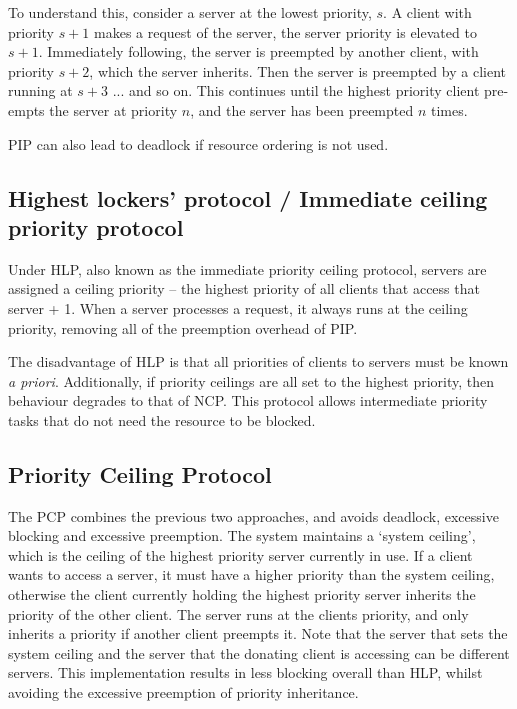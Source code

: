 To understand this, consider a  server at the lowest priority, $s$.
A client with priority $s + 1$ makes a request of the server, the server priority is elevated to $s + 1$.
Immediately following, the server is preempted by another client, with priority $s + 2$, which the server inherits.
Then the server is preempted by a client running at $s + 3$ ... and so on.
This continues until the highest priority client pre-empts the server at priority $n$, and the server has been preempted $n$ times.

\gls{PIP} can also lead to deadlock if resource ordering is not used.

\subsection{Highest lockers' protocol / Immediate ceiling priority protocol}
\label{sec:hlp}

Under \gls{HLP}, also known as the immediate priority ceiling protocol, servers are assigned a ceiling priority -- the highest priority of all clients that access that server + 1.
When a server processes a request, it always runs at the ceiling priority, removing all of the preemption overhead of \gls{PIP}.

The disadvantage of \gls{HLP} is that all priorities of clients to servers must be known \emph{a priori}.
Additionally, if priority ceilings are all set to the highest priority, then behaviour degrades to that of \gls{NCP}.
This protocol allows intermediate priority tasks that do not need the resource to be blocked.

\subsection{Priority Ceiling Protocol}

The \gls{PCP} combines the previous two approaches, and avoids deadlock, excessive blocking and excessive preemption.
The system maintains a `system ceiling', which is the ceiling of the highest priority server currently in use.
If a client wants to access a server, it must have a higher priority than the system ceiling, otherwise the client currently holding the highest priority server inherits the priority of the other client.
The server runs at the clients priority, and only inherits a priority if another client preempts it.
Note that the server that sets the system ceiling and the server that the donating client is accessing can be different servers.
This implementation results in less blocking overall than \gls{HLP}, whilst avoiding the excessive preemption of priority inheritance.


